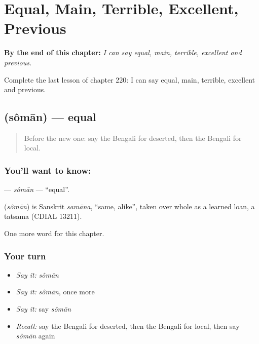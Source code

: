 
\chapter{Equal, Main, Terrible, Excellent, Previous}
\label{ch:bn-equal-main-terrible-excellent-previous}

\begin{chapteropening}
\textbf{By the end of this chapter:} \emph{I can say equal, main, terrible, excellent and previous.}

Complete the last lesson of chapter 220: I can say equal, main, terrible, excellent and previous.
\end{chapteropening}

\section[\texorpdfstring{\bn{সমান} (sômān)}{সমান (sômān)}]{ (sômān) — equal}

\label{lesson:BN-C220-soman}



\begin{quote}
Before the new one: say the Bengali for deserted, then the Bengali for local.
\end{quote}

\subsection*{You'll want to know: }
\textbf{} — \emph{sômān} — \textquotedblleft{}equal\textquotedblright{}.

\begin{cousinweb}
\textbf{} (\emph{sômān}) is Sanskrit \emph{samāna}, \textquotedblleft{}same, alike\textquotedblright{}, taken over whole as a learned loan, a tatsama (CDIAL 13211).
\end{cousinweb}

\begin{grammarlens}[title={What you've built}]
One more word for this chapter.
\end{grammarlens}

\subsection*{Your turn}
\begin{itemize}
\raggedright
  \item \emph{Say it:} \emph{sômān}
  \item \emph{Say it:} \emph{sômān}, once more
  \item \emph{Say it:} say \emph{sômān}
  \item \emph{Recall:} say the Bengali for deserted, then the Bengali for local, then say \emph{sômān} again
\end{itemize}


